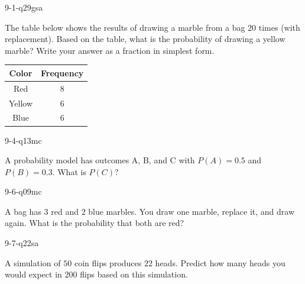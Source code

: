 \begin{practiceQuestion}{9-1-q29}{gsa}
\begin{questionText}
The table below shows the results of drawing a marble from a bag $20$ times (with replacement). Based on the table, what is the probability of drawing a yellow marble? Write your answer as a fraction in simplest form.

\begin{center}
\begin{tabular}{|c|c|}
\hline
\textbf{Color} & \textbf{Frequency} \\
\hline
Red & $8$ \\
\hline
Yellow & $6$ \\
\hline
Blue & $6$ \\
\hline
\end{tabular}
\end{center}
\end{questionText}
\end{practiceQuestion}

\begin{practiceQuestion}{9-4-q13}{mc}
\begin{questionText}
A probability model has outcomes A, B, and C with $P(A) = 0.5$ and $P(B) = 0.3$. What is $P(C)$?
\end{questionText}
\end{practiceQuestion}

\begin{practiceQuestion}{9-6-q09}{mc}
\begin{questionText}
A bag has $3$ red and $2$ blue marbles. You draw one marble, replace it, and draw again. What is the probability that both are red?
\end{questionText}
\end{practiceQuestion}

\begin{practiceQuestion}{9-7-q22}{sa}
\begin{questionText}
A simulation of $50$ coin flips produces $22$ heads. Predict how many heads you would expect in $200$ flips based on this simulation.
\end{questionText}
\end{practiceQuestion}
